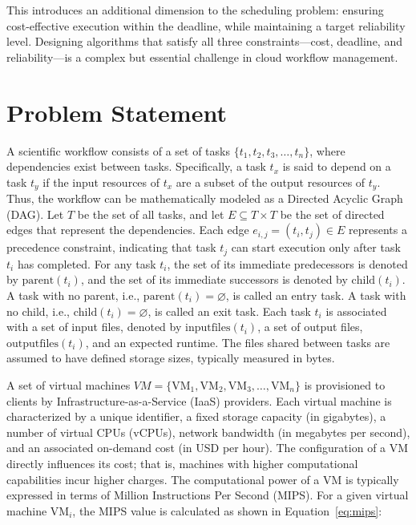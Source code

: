 \documentclass[12pt]{tcc}
\begin{document}
	This introduces an additional dimension to the scheduling problem: ensuring cost-effective execution within the deadline, while maintaining a target reliability level. Designing algorithms that satisfy all three constraints—cost, deadline, and reliability—is a complex but essential challenge in cloud workflow management.

	
	\chapter{Problem Statement}
	\label{sec_fund_teorica}
	
	A scientific workflow consists of a set of tasks \( \{t_1, t_2, t_3, \ldots, t_n\} \), where dependencies exist between tasks. Specifically, a task \( t_x \) is said to depend on a task \( t_y \) if the input resources of \( t_x \) are a subset of the output resources of \( t_y \). Thus, the workflow can be mathematically modeled as a Directed Acyclic Graph (DAG). Let \( T \) be the set of all tasks, and let \( E \subseteq T \times T \) be the set of directed edges that represent the dependencies. Each edge \( e_{i,j} = (t_i, t_j) \in E \) represents a precedence constraint, indicating that task \( t_j \) can start execution only after task \( t_i \) has completed. For any task \( t_i \), the set of its immediate predecessors is denoted by \( \text{parent}(t_i) \), and the set of its immediate successors is denoted by \( \text{child}(t_i) \). A task with no parent, i.e., \( \text{parent}(t_i) = \varnothing \), is called an entry task. A task with no child, i.e., \( \text{child}(t_i) = \varnothing \), is called an exit task. Each task \( t_i \) is associated with a set of input files, denoted by \( \text{inputfiles}(t_i) \), a set of output files, \( \text{outputfiles}(t_i) \), and an expected runtime. The files shared between tasks are assumed to have defined storage sizes, typically measured in bytes.

	
A set of virtual machines \(VM = \{\text{VM}_1, \text{VM}_2, \text{VM}_3, \ldots, \text{VM}_n\} \) is provisioned to clients by Infrastructure-as-a-Service (IaaS) providers. Each virtual machine is characterized by a unique identifier, a fixed storage capacity (in gigabytes), a number of virtual CPUs (vCPUs), network bandwidth (in megabytes per second), and an associated on-demand cost (in USD per hour). The configuration of a VM directly influences its cost; that is, machines with higher computational capabilities incur higher charges. The computational power of a VM is typically expressed in terms of Million Instructions Per Second (MIPS). For a given virtual machine \( \text{VM}_i \), the MIPS value is calculated as shown in Equation~\eqref{eq:mips}:
\end{document}
